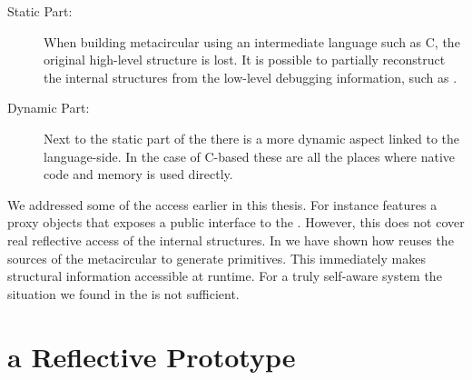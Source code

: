\begin{description}
	\item[Static Part:] 
	When building metacircular \VMs using an intermediate language such as C, the original high-level structure is lost.
	It is possible to partially reconstruct the internal structures from the low-level debugging information, such as \Dwarf.
	
	\item[Dynamic Part:]
	Next to the static part of the \VM there is a more dynamic aspect linked to the language-side.
	In the case of C-based \VM these are all the places where native code and memory is used directly.
\end{description}

We addressed some of the access earlier in this thesis.
For instance \NB features a \VM proxy objects that exposes a public interface to the \VM.
However, this does not cover real reflective access of the \VM internal structures.
In  we have shown how \WF reuses the sources of the metacircular \VM to generate primitives.
This immediately makes structural information accessible at runtime.
For a truly self-aware system the situation we found in the \PH \VM is not sufficient.



\section{\Mate a Reflective \VM Prototype}
\\

